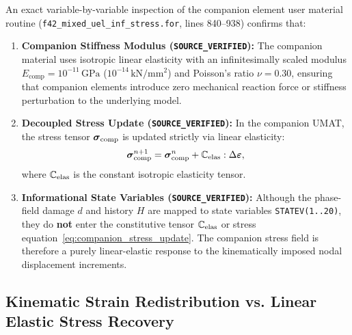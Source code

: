 An exact variable-by-variable inspection of the companion element user material routine (\texttt{f42\_mixed\_uel\_inf\_stress.for}, lines 840--938) confirms that:
\begin{enumerate}
    \item \textbf{Companion Stiffness Modulus (\texttt{SOURCE\_VERIFIED}):} The companion material uses isotropic linear elasticity with an infinitesimally scaled modulus $E_{\mathrm{comp}} = 10^{-11}\,\mathrm{GPa}$ ($10^{-14}\,\mathrm{kN/mm^2}$) and Poisson's ratio $\nu = 0.30$, ensuring that companion elements introduce zero mechanical reaction force or stiffness perturbation to the underlying model.
    \item \textbf{Decoupled Stress Update (\texttt{SOURCE\_VERIFIED}):} In the companion UMAT, the stress tensor $\boldsymbol{\sigma}_{\mathrm{comp}}$ is updated strictly via linear elasticity:
    \begin{equation}
    \label{eq:companion_stress_update}
    \boldsymbol{\sigma}_{\mathrm{comp}}^{n+1} = \boldsymbol{\sigma}_{\mathrm{comp}}^n + \mathbb{C}_{\mathrm{elas}} : \Delta\boldsymbol{\varepsilon},
    \end{equation}
    where $\mathbb{C}_{\mathrm{elas}}$ is the constant isotropic elasticity tensor.
    \item \textbf{Informational State Variables (\texttt{SOURCE\_VERIFIED}):} Although the phase-field damage $d$ and history $H$ are mapped to state variables \texttt{STATEV(1..20)}, they do \textbf{not} enter the constitutive tensor $\mathbb{C}_{\mathrm{elas}}$ or stress equation~\eqref{eq:companion_stress_update}. The companion stress field is therefore a purely linear-elastic response to the kinematically imposed nodal displacement increments.
\end{enumerate}

\subsection{Kinematic Strain Redistribution vs. Linear Elastic Stress Recovery}
\label{subsec:stage14r_kinematics}

